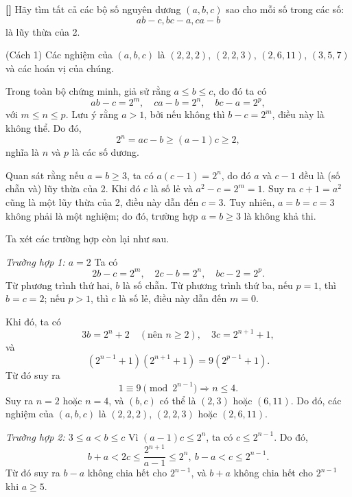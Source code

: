 \documentclass[../02-modular-arithmetic-b.tex]{subfiles}
\begin{document}
\begin{example*}\label{example:IMO-2015-P2}\textbf{[]}
	Hãy tìm tất cả các bộ số nguyên dương $(a, b, c)$ sao cho mỗi số trong các số:
	\[
		ab - c, bc - a, ca - b
	\]
	là lũy thừa của 2.
\end{example*}

\begin{soln}\footnotemark(Cách 1)
	Các nghiệm của \( (a,b,c) \) là \( (2,2,2) \), \( (2,2,3) \), \( (2,6,11) \), \( (3,5,7) \) và các hoán vị của chúng.

	Trong toàn bộ chứng minh, giả sử rằng \( a \leq b \leq c \), do đó ta có  
	\[
		ab - c = 2^m, \quad ca - b = 2^n, \quad bc - a = 2^p,
	\]
	với \( m \leq n \leq p \). Lưu ý rằng \( a > 1 \), bởi nếu không thì \( b - c = 2^m \), điều này là không thể. Do đó,  
	\[
		2^n = ac - b \geq (a - 1)c \geq 2,
	\]
	nghĩa là \( n \) và \( p \) là các số dương.
	
	Quan sát rằng nếu \( a = b \geq 3 \), ta có \( a(c - 1) = 2^n \), do đó \( a \) và \( c - 1 \) đều là (số chẵn và) lũy thừa của 2.
	Khi đó \( c \) là số lẻ và \( a^2 - c = 2^m = 1 \). Suy ra \( c+1 = a^2 \) cũng là một lũy thừa của 2, điều này dẫn đến \( c = 3 \).
	Tuy nhiên, \( a = b = c = 3 \) không phải là một nghiệm; do đó, trường hợp \( a = b \geq 3 \) là không khả thi.
	
	Ta xét các trường hợp còn lại như sau.
	
	\textit{Trường hợp 1: \( a = 2 \)}
	Ta có  
	\[
		2b - c = 2^m, \quad 2c - b = 2^n, \quad bc - 2 = 2^p.
	\]
	Từ phương trình thứ hai, \( b \) là số chẵn. Từ phương trình thứ ba, nếu \( p = 1 \), thì \( b = c = 2 \);
	nếu \( p > 1 \), thì \( c \) là số lẻ, điều này dẫn đến \( m = 0 \).
	
	Khi đó, ta có  
	\[
		3b = 2^n + 2 \quad (\text{nên } n \geq 2), \quad 3c = 2^{n+1} + 1,
	\]
	và  
	\[
		(2^{n-1} + 1)(2^{n+1} + 1) = 9(2^{p-1} + 1).
	\]
	Từ đó suy ra  
	\[
		1 \equiv 9 \pmod{2^{n-1}} \Rightarrow n \leq 4.
	\]
	Suy ra \( n = 2 \) hoặc \( n = 4 \), và \( (b,c) \) có thể là \( (2,3) \) hoặc \( (6,11) \).
	Do đó, các nghiệm của \( (a,b,c) \) là \( (2,2,2) \), \( (2,2,3) \) hoặc \( (2,6,11) \).
	
	\textit{Trường hợp 2: \( 3 \leq a < b \leq c \)}
	Vì \( (a - 1)c \leq 2^n \), ta có \( c \leq 2^{n-1} \). Do đó,
	\[
		b + a < 2c \leq \frac{2^{n+1}}{a-1} \leq 2^n,\ b - a < c \leq 2^{n-1}.
	\]
	Từ đó suy ra \( b - a \) không chia hết cho \( 2^{n-1} \), và \( b + a \) không chia hết cho \( 2^{n-1} \) khi \( a \geq 5 \).  
	

\end{soln}
\end{document}
